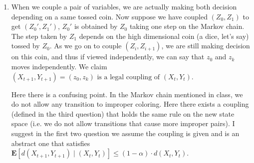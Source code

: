 \documentclass{article}
\theoremstyle{definition}
\begin{document}
	\begin{enumerate}[(1)]
		\item When we couple a pair of variables, we are actually making both decision depending on a same tossed coin. Now suppose we have coupled $(Z_0, Z_1)$ to get $(Z_0', Z_1')$, $Z_0'$ is obtained by $Z_0$ taking one step on the Markov chain. The step taken by $Z_1$ depends on the high dimensional coin (a dice, let's say) tossed by $Z_0$. As we go on to couple $(Z_i, Z_{i+1})$, we are still making decision on this coin, and thus if viewed independently, we can say that $z_0$ and $z_k$ moves independently. We claim $\left(X_{t+1}, Y_{t+1}\right)=\left(z_0, z_k\right) \text { is a legal coupling of }\left(X_t, Y_t\right)$. 
		
		\noindent Here there is a confusing point. In the Markov chain mentioned in class, we do not allow any transition to improper coloring. Here there exists a coupling (defined in the third question) that holds the same rule on the new state space (i.e. we do not allow transitions that cause more improper pairs). I suggest in the first two question we assume the coupling is given and is an abstract one that satisfies $\mathbf{E}\left[d\left(X_{t+1}, Y_{t+1}\right) \mid\left(X_t, Y_t\right)\right] \leq(1-\alpha) \cdot d\left(X_t, Y_t\right)$.
		

\end{enumerate}
\end{document}
